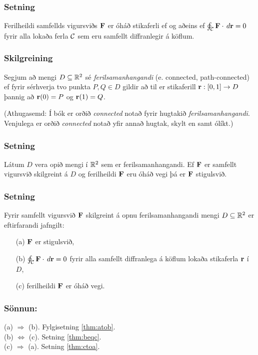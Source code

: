 \subsubsection{Setning }
  Ferilheildi samfellds vigursviðs $\mbox{${\bf F}$}$ er óháð
stikaferli ef og aðeins ef $\oint_{\cal C} \mbox{${\bf F}$}\cdot\,d\mbox{${\bf r}$}=0$ fyrir alla
lokaða ferla $\cal C$ sem eru samfellt diffranlegir á köflum. 



\subsubsection{Skilgreining \rtask{}}
   Segjum að mengi $D\subseteq {\mathbb R}^2$ sé {\em
  ferilsamanhangandi} (e. connected, path-connected)  ef fyrir
  sérhverja tvo punkta $P, Q\in D$ gildir 
að til er stikaferill $\mbox{${\bf r}$}:[0,1]\rightarrow D$ þannig að $\mbox{${\bf r}$}(0)=P$ og
$\mbox{${\bf r}$}(1)=Q$.

\bigskip
(Athugasemd:  Í bók er orðið {\em connected} notað fyrir hugtakið {\em
  ferilsamanhangandi}.  Venjulega er orðið {\em connected} notað yfir
  annað hugtak, skylt en samt ólíkt.)




\subsubsection{Setning  }
 Látum $D$ vera opið mengi í ${\mathbb R}^2$ sem er ferilsamanhangandi.  Ef $\mbox{${\bf F}$}$ er samfellt vigursvið skilgreint á $D$ og ferilheildi $\mbox{${\bf F}$}$ eru óháð vegi þá er $\mbox{${\bf F}$}$ stigulsvið.
    



\subsubsection{Setning \rtask{}}
 Fyrir samfellt vigursvið $\mbox{${\bf F}$}$ skilgreint á opnu 
ferilsamanhangandi mengi $D\subseteq {\mathbb R}^2$ er eftirfarandi jafngilt:
\begin{itemize}
 \item [(a)] $\mbox{${\bf F}$}$ er stigulsvið,
 \item [(b)]  $\oint_{\cal C} \mbox{${\bf F}$}\cdot\,d\mbox{${\bf r}$}=0$ fyrir alla samfellt diffranlega
á köflum lokaða stikaferla $\mbox{${\bf r}$}$ í $D$, 
\item [(c)] ferilheildi $\mbox{${\bf F}$}$ er óháð vegi.
\end{itemize}

\pause
\subsubsection{Sönnun: } 
(a) $\Rightarrow$ (b). Fylgisetning \ref{thm:atob}. \\
(b) $\Leftrightarrow$ (c). Setning \ref{thm:beqc}. \\
(c) $\Rightarrow$ (a). Setning \ref{thm:ctoa}.
 




